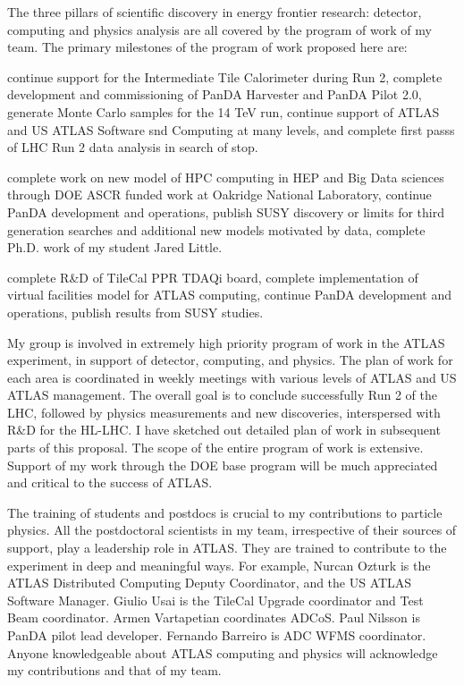The three pillars of scientific discovery in energy frontier research: detector, computing and physics analysis are all covered by the program of work of my team. The primary milestones of the program of work proposed here are:
\begin{description}
\item[2017] continue support for the Intermediate Tile Calorimeter during Run 2, complete development and commissioning of PanDA Harvester and PanDA Pilot 2.0, generate Monte Carlo samples for the 14 TeV run, continue support of ATLAS and US ATLAS Software snd Computing at many levels, and complete first passs of LHC Run 2 data analysis in search of stop.
\item[2018] complete work on new model of HPC computing in HEP and Big Data sciences through DOE ASCR funded work at Oakridge National Laboratory, continue PanDA development and operations, publish SUSY discovery or limits for third generation searches and additional new models motivated by data, complete Ph.D. work of my student Jared Little.
\item[2019] complete R\&D of TileCal PPR TDAQi board, complete implementation of virtual facilities model for ATLAS computing, continue PanDA development and operations, publish results from SUSY studies.
\end{description}

My group is involved in extremely high priority program of work in the ATLAS experiment, in support of detector, computing, and physics. The plan of work for each area is coordinated in weekly meetings with various levels of ATLAS and US ATLAS management. The overall goal is to conclude successfully Run 2 of the LHC, followed by physics measurements and new discoveries, interspersed with R\&D for the HL-LHC. I have sketched out detailed plan of work in subsequent parts of this proposal. The scope of the entire program of work is extensive. Support of my work through the DOE base program will be much appreciated and critical to the success of ATLAS.

The training of students and postdocs is crucial to my contributions to particle physics. All the postdoctoral scientists in my team, irrespective of their sources of support, play a leadership role in ATLAS. They are trained to contribute to the experiment in deep and meaningful ways. For example, Nurcan Ozturk is the ATLAS Distributed Computing Deputy Coordinator, and the US ATLAS Software Manager. Giulio Usai is the TileCal Upgrade coordinator and Test Beam coordinator. Armen Vartapetian coordinates ADCoS. Paul Nilsson is PanDA pilot lead developer. Fernando Barreiro is ADC WFMS coordinator. Anyone knowledgeable about ATLAS computing and physics will acknowledge my contributions and that of my team.

